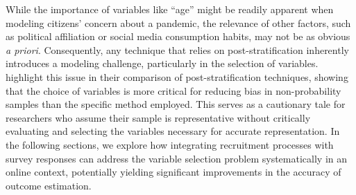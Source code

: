 \documentclass[letterpaper,12pt]{article}
\theoremstyle{proposition}
\begin{document}
While the importance of variables like ``age'' might be readily apparent when modeling citizens’ concern about a pandemic, the relevance of other factors, such as political affiliation or social media consumption habits, may not be as obvious \textit{a priori}. Consequently, any technique that relies on post-stratification inherently introduces a modeling challenge, particularly in the selection of variables. \citet{Mercer2018} highlight this issue in their comparison of post-stratification techniques, showing that the choice of variables is more critical for reducing bias in non-probability samples than the specific method employed. This serves as a cautionary tale for researchers who assume their sample is representative without critically evaluating and selecting the variables necessary for accurate representation. In the following sections, we explore how integrating recruitment processes with survey responses can address the variable selection problem systematically in an online context, potentially yielding significant improvements in the accuracy of outcome estimation.


\end{document}
